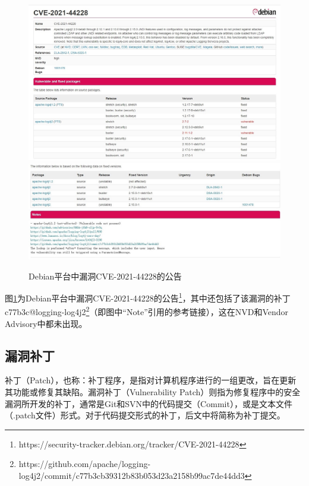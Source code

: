 

\begin{figure}[!t]
    \centering
    \includegraphics[width=1.0\textwidth]{fig/debian-2021-44228}
    \includegraphics[width=1.0\textwidth]{fig/debian-2021-44228-2}
    \caption{Debian平台中漏洞CVE-2021-44228的公告}
    \label{fig:debian-2021-44228}
\end{figure}
图\ref{fig:debian-2021-44228}为Debian平台中漏洞CVE-2021-44228的公告\footnote{https://security-tracker.debian.org/tracker/CVE-2021-44228}，其中还包括了该漏洞的补丁c77b3c@logging-log4j2\footnote{https://github.com/apache/logging-log4j2/commit/c77b3cb39312b83b053d23a2158b99ac7de44dd3}（即图中“Note”引用的参考链接），这在NVD和Vendor Advisory中都未出现。


\subsection{漏洞补丁}
补丁（Patch），也称：补丁程序，是指对计算机程序进行的一组更改，旨在更新其功能或修复其缺陷。漏洞补丁（Vulnerability Patch）则指为修复程序中的安全漏洞所开发的补丁，通常是Git和SVN中的代码提交（Commit），或是文本文件（.patch文件）形式。对于代码提交形式的补丁，后文中将简称为补丁提交。

